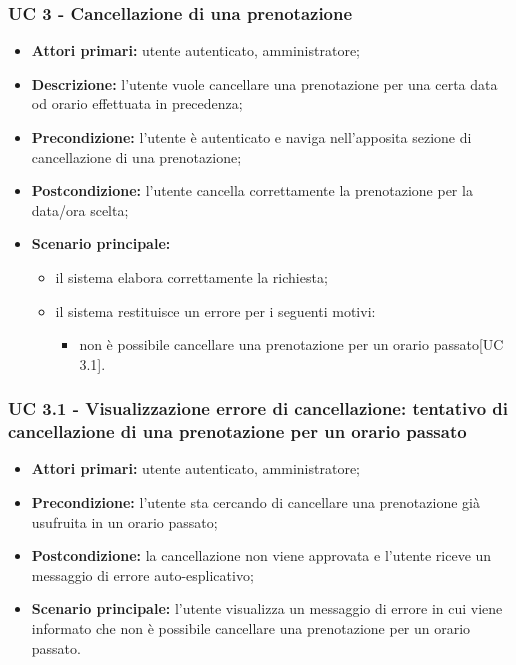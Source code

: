 \subsubsection{UC 3 - Cancellazione di una prenotazione}

\begin{itemize}
\item \textbf{Attori primari:} utente autenticato, amministratore;
\item \textbf{Descrizione:} l’utente vuole cancellare una prenotazione per una certa data od orario effettuata in precedenza;
\item \textbf{Precondizione:} l’utente è autenticato e naviga nell’apposita sezione di cancellazione di una prenotazione;
\item \textbf{Postcondizione:} l’utente cancella correttamente la prenotazione per la data/ora scelta;
\item \textbf{Scenario principale:} 
	\begin{itemize}
		\item il sistema elabora correttamente la richiesta;
		\item il sistema restituisce un errore per i seguenti motivi:
		\begin{itemize}
			\item non è possibile cancellare una prenotazione per un orario passato[UC 3.1].
		\end{itemize}
	\end{itemize}
\end{itemize}

\subsubsection{UC 3.1 - Visualizzazione errore di cancellazione: tentativo di cancellazione di una prenotazione per un orario passato}
\begin{itemize}
\item \textbf{Attori primari:} utente autenticato, amministratore;
\item \textbf{Precondizione:} l'utente sta cercando di cancellare una prenotazione già usufruita in un orario passato;
\item \textbf{Postcondizione:} la cancellazione non viene approvata e l'utente riceve un messaggio di errore auto-esplicativo;
\item \textbf{Scenario principale:} l'utente visualizza un messaggio di errore in cui viene informato che non è possibile cancellare una prenotazione per un orario passato.
\end{itemize}


